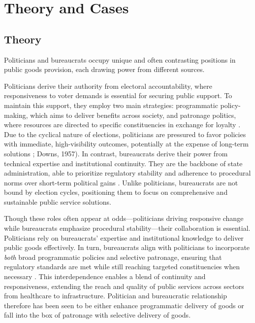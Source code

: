 \section{Theory and Cases}

\subsection{Theory}
Politicians and bureaucrats occupy unique and often contrasting positions in public goods provision, each drawing power from different sources. 

Politicians derive their authority from electoral accountability, where responsiveness to voter demands is essential for securing public support. To maintain this support, they employ two main strategies: programmatic policy-making, which aims to deliver benefits across society, and patronage politics, where resources are directed to specific constituencies in exchange for loyalty\citep{kitschelt_patrons_2007} . Due to the cyclical nature of elections, politicians are pressured to favor policies with immediate, high-visibility outcomes, potentially at the expense of long-term solutions \citep{schlesinger_ambition_1966}; Downs, 1957). In contrast, bureaucrats derive their power from technical expertise and institutional continuity. They are the backbone of state administration, able to prioritize regulatory stability and adherence to procedural norms over short-term political gains \citep{weber_max_1946}. Unlike politicians, bureaucrats are not bound by election cycles, positioning them to focus on comprehensive and sustainable public service solutions.

Though these roles often appear at odds—politicians driving responsive change while bureaucrats emphasize procedural stability—their collaboration is essential. Politicians rely on bureaucrats' expertise and institutional knowledge to deliver public goods effectively. In turn, bureaucrats align with politicians to incorporate \textit{both} broad programmatic policies and selective patronage, ensuring that regulatory standards are met while still reaching targeted constituencies when necessary . This interdependence enables a blend of continuity and responsiveness, extending the reach and quality of public services across sectors from healthcare to infrastructure. Politician and bureaucratic relationship therefore has been seen to be either enhance programmatic delivery of goods or fall into the box of patronage with selective delivery of goods. 

